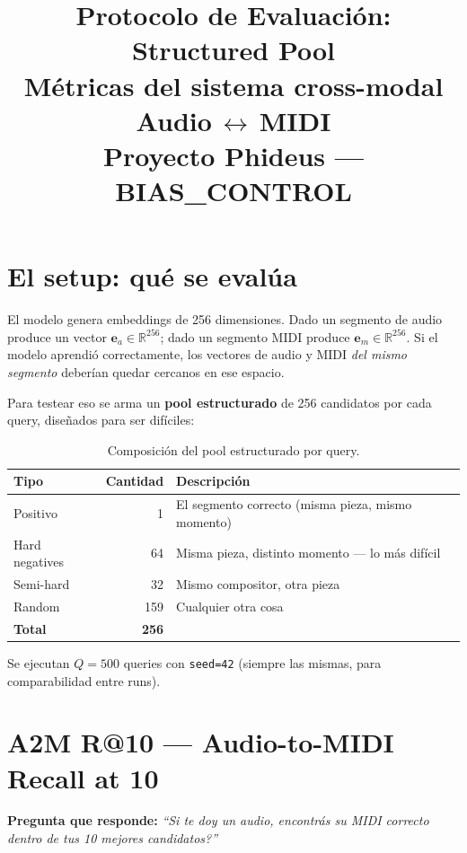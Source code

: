 \documentclass[11pt,a4paper]{article}
\title{\vspace{-1.5cm}\textbf{Protocolo de Evaluaci\'on: Structured Pool}\\[4pt]
\large M\'etricas del sistema cross-modal Audio\,$\leftrightarrow$\,MIDI\\[2pt]
\normalsize Proyecto Phideus --- BIAS\_CONTROL}
\author{}
\date{}
\newcommand{\metrica}[1]{\textbf{\textsf{#1}}}
\begin{document}
\maketitle
\thispagestyle{empty}

\section{El setup: qu\'e se eval\'ua}

El modelo genera embeddings de 256 dimensiones.
Dado un segmento de audio produce un vector $\mathbf{e}_a \in \mathbb{R}^{256}$;
dado un segmento MIDI produce $\mathbf{e}_m \in \mathbb{R}^{256}$.
Si el modelo aprendi\'o correctamente, los vectores de audio y MIDI
\emph{del mismo segmento} deber\'ian quedar cercanos en ese espacio.

Para testear eso se arma un \textbf{pool estructurado} de 256 candidatos
por cada query, dise\~nados para ser dif\'iciles:

\begin{table}[h]
\centering
\begin{tabular}{@{}lrl@{}}
\toprule
\textbf{Tipo} & \textbf{Cantidad} & \textbf{Descripci\'on} \\
\midrule
Positivo        & 1   & El segmento correcto (misma pieza, mismo momento) \\
Hard negatives  & 64  & Misma pieza, distinto momento --- lo m\'as dif\'icil \\
Semi-hard       & 32  & Mismo compositor, otra pieza \\
Random          & 159 & Cualquier otra cosa \\
\midrule
\textbf{Total}  & \textbf{256} & \\
\bottomrule
\end{tabular}
\caption{Composici\'on del pool estructurado por query.}
\label{tab:pool}
\end{table}

Se ejecutan $Q = 500$ queries con \texttt{seed=42}
(siempre las mismas, para comparabilidad entre runs).

\section{\metrica{A2M R@10} --- Audio-to-MIDI Recall at 10}

\textbf{Pregunta que responde:}
\emph{``Si te doy un audio, \textquestiondown encontr\'as su MIDI correcto
dentro de tus 10 mejores candidatos?''}
\end{document}
